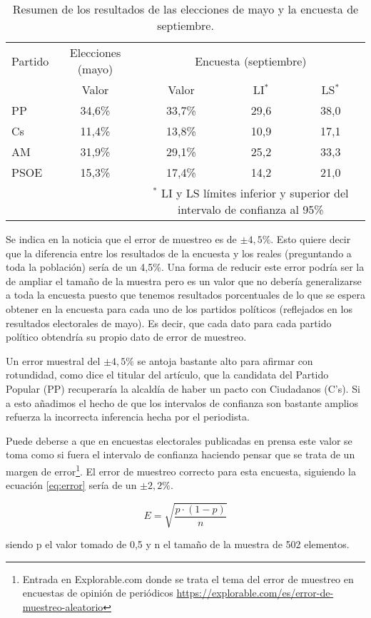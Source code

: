 \documentclass[11pt,a4paper]{article}
\begin{document}
\begin{table}
	\centering
	\begin{tabular}{lcccc}
	\toprule[0.4mm]
	Partido & Elecciones (mayo) & \multicolumn{3}{c}{Encuesta (septiembre)}\\
	& Valor & Valor & LI$^{*}$ & LS$^{*}$ \\
	\midrule
	PP & 34,6\% & 33,7\% & 29,6 & 38,0 \\
	Cs & 11,4\% & 13,8\% & 10,9 & 17,1 \\
	AM & 31,9\% & 29,1\% & 25,2 & 33,3 \\
	PSOE & 15,3\% & 17,4\% & 14,2 & 21,0 \\
	\bottomrule[0.4mm]
	& & \multicolumn{3}{p{3.4cm}}{\footnotesize{$^{*}$ LI y LS límites inferior y superior del intervalo de confianza al 95\%}}
	\end{tabular}
	\caption{Resumen de los resultados de las elecciones de mayo y la encuesta de septiembre.}
\label{tab:resumen}
\end{table}

Se indica en la noticia que el error de muestreo es de $\pm4,5\%$. Esto quiere decir que la diferencia entre los resultados de la encuesta y los reales (preguntando a toda la población) sería de un 4,5\%. Una forma de reducir este error podría ser la de ampliar el tamaño de la muestra pero es un valor que no debería generalizarse a toda la encuesta puesto que tenemos resultados porcentuales de lo que se espera obtener en la encuesta para cada uno de los partidos políticos (reflejados en los resultados electorales de mayo). Es decir, que cada dato para cada partido político obtendría su propio dato de error de muestreo.

Un error muestral del $\pm4,5\%$ se antoja bastante alto para afirmar con rotundidad, como dice el titular del artículo, que la candidata del  Partido Popular (PP) recuperaría la alcaldía de haber un pacto con Ciudadanos (C's). Si a esto añadimos el hecho de que los intervalos de confianza son bastante amplios refuerza la incorrecta inferencia hecha por el periodista. {\color{dkgreen}Puede deberse a que en encuestas electorales publicadas en prensa este valor se toma como si fuera el intervalo de confianza haciendo pensar que se trata de un margen de error\footnote{Entrada en Explorable.com donde se trata el tema del error de muestreo en encuestas de opinión de periódicos \url{https://explorable.com/es/error-de-muestreo-aleatorio}}. El error de muestreo correcto para esta encuesta, siguiendo la ecuación \ref{eq:error} sería de un $\pm2,2\%$.

\begin{equation}
E=\sqrt{\frac{p \cdot (1-p)}{n}}
\label{eq:error}
\end{equation}

\noindent siendo p el valor tomado de 0,5 y n el tamaño de la muestra de 502 elementos.}
\end{document}
